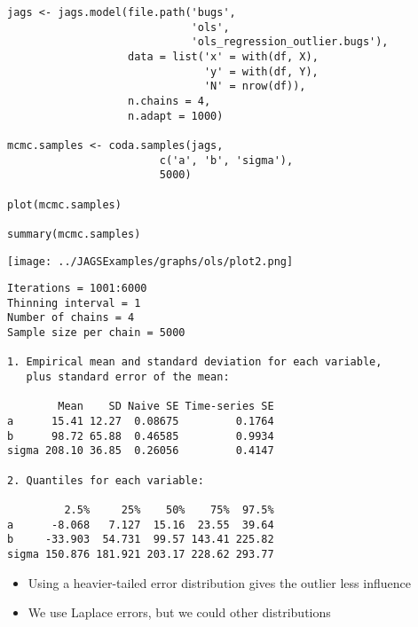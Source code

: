 \documentclass{beamer}
\begin{document}
\begin{frame}[fragile]
  \begin{verbatim}
jags <- jags.model(file.path('bugs',
                             'ols',
                             'ols_regression_outlier.bugs'),
                   data = list('x' = with(df, X),
                               'y' = with(df, Y),
                               'N' = nrow(df)),
                   n.chains = 4,
                   n.adapt = 1000)
 
mcmc.samples <- coda.samples(jags,
                        c('a', 'b', 'sigma'),
                        5000)

plot(mcmc.samples)

summary(mcmc.samples)
  \end{verbatim}
\end{frame}

\begin{frame}[fragile]
  \begin{center}
    \texttt{[image: ../JAGSExamples/graphs/ols/plot2.png]}
  \end{center}
\end{frame}

\begin{frame}[fragile]
  \begin{verbatim}
Iterations = 1001:6000
Thinning interval = 1 
Number of chains = 4 
Sample size per chain = 5000 

1. Empirical mean and standard deviation for each variable,
   plus standard error of the mean:

        Mean    SD Naive SE Time-series SE
a      15.41 12.27  0.08675         0.1764
b      98.72 65.88  0.46585         0.9934
sigma 208.10 36.85  0.26056         0.4147

2. Quantiles for each variable:

         2.5%     25%    50%    75%  97.5%
a      -8.068   7.127  15.16  23.55  39.64
b     -33.903  54.731  99.57 143.41 225.82
sigma 150.876 181.921 203.17 228.62 293.77
  \end{verbatim}
\end{frame}

\frame
{
  \begin{itemize}
    \item{Using a heavier-tailed error distribution gives the outlier less influence}
    \item{We use Laplace errors, but we could other distributions}
  \end{itemize}
}
\end{document}
